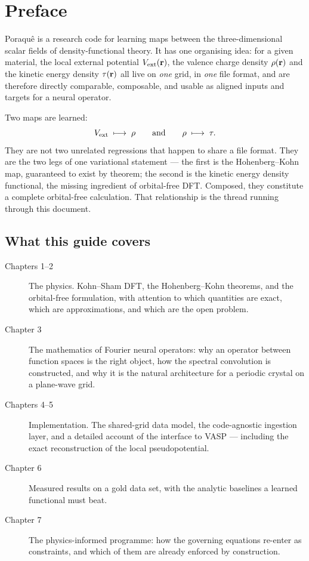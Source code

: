 \chapter*{Preface}

Poraqu\^e is a research code for learning maps between the three-dimensional
scalar fields of density-functional theory. It has one organising idea: for a
given material, the local external potential $V_{\mathrm{ext}}(\mathbf{r})$, the valence charge
density $\rho(\mathbf{r})$ and the kinetic energy density $\tau(\mathbf{r})$ all live on
\emph{one} grid, in \emph{one} file format, and are therefore directly
comparable, composable, and usable as aligned inputs and targets for a neural
operator.

Two maps are learned:
\[
  V_{\mathrm{ext}} \;\longmapsto\; \rho
  \qquad\text{and}\qquad
  \rho \;\longmapsto\; \tau .
\]
They are not two unrelated regressions that happen to share a file format. They
are the two legs of one variational statement --- the first is the
Hohenberg--Kohn map, guaranteed to exist by theorem; the second is the kinetic
energy density functional, the missing ingredient of orbital-free DFT. Composed,
they constitute a complete orbital-free calculation. That relationship is the
thread running through this document.

\section*{What this guide covers}

\begin{description}
  \item[Chapters 1--2] The physics. Kohn--Sham DFT, the Hohenberg--Kohn
    theorems, and the orbital-free formulation, with attention to which
    quantities are exact, which are approximations, and which are the open
    problem.
  \item[Chapter 3] The mathematics of Fourier neural operators: why an operator
    between function spaces is the right object, how the spectral convolution
    is constructed, and why it is the natural architecture for a periodic
    crystal on a plane-wave grid.
  \item[Chapters 4--5] Implementation. The shared-grid data model, the
    code-agnostic ingestion layer, and a detailed account of the interface to
    VASP --- including the exact reconstruction of the local pseudopotential.
  \item[Chapter 6] Measured results on a gold data set, with the analytic
    baselines a learned functional must beat.
  \item[Chapter 7] The physics-informed programme: how the governing equations
    re-enter as constraints, and which of them are already enforced by
    construction.
\end{description}

